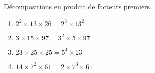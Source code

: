     Décompositions en produit de facteurs premiers.
    \begin{enumerate}
        \item $2^2\times 13\times 26=2^3\times 13^2$
        \item $3\times 15\times 97=3^2\times 5\times 97$
        \item $23\times 25\times 25=5^4\times 23$
        \item $14\times 7^2\times 61=2\times 7^3\times 61$
    \end{enumerate}
